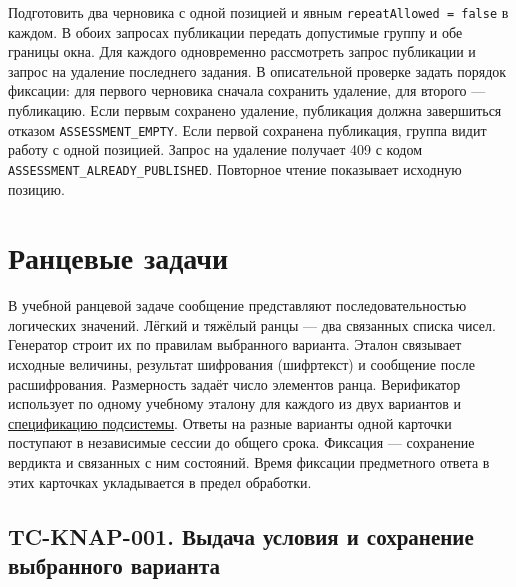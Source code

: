 \documentclass[12pt,a4paper]{article}
\begin{document}
Подготовить два черновика с одной позицией и явным \texttt{repeat\allowbreak{}Allowed =\allowbreak{} false} в каждом. В обоих запросах публикации передать допустимые группу и обе границы окна. Для каждого одновременно рассмотреть запрос публикации и запрос на удаление последнего задания. В описательной проверке задать порядок фиксации: для первого черновика сначала сохранить удаление, для второго --- публикацию. Если первым сохранено удаление, публикация должна завершиться отказом \texttt{ASSESSMENT\_\allowbreak{}EMPTY}. Если первой сохранена публикация, группа видит работу с одной позицией. Запрос на удаление получает 409 с кодом \texttt{ASSESSMENT\_\allowbreak{}ALREADY\_\allowbreak{}PUBLISHED}. Повторное чтение показывает исходную позицию.

\section{Ранцевые задачи}\label{ux440ux430ux43dux446ux435ux432ux44bux435-ux437ux430ux434ux430ux447ux438}

\hypertarget{ранцевые-задачи}{}

В учебной ранцевой задаче сообщение представляют последовательностью логических значений. Лёгкий и тяжёлый ранцы --- два связанных списка чисел. Генератор строит их по правилам выбранного варианта. Эталон связывает исходные величины, результат шифрования (шифртекст) и сообщение после расшифрования. Размерность задаёт число элементов ранца. Верификатор использует по одному учебному эталону для каждого из двух вариантов и {\href{../07\_Программные\_требования/DOC-06.3\_Ранцевые\_криптосистемы.pdf\#doc-063-ранцевые-криптосистемы}{спецификацию подсистемы}}. Ответы на разные варианты одной карточки поступают в независимые сессии до общего срока. Фиксация --- сохранение вердикта и связанных с ним состояний. Время фиксации предметного ответа в этих карточках укладывается в предел обработки.

\subsection{TC-KNAP-001. Выдача условия и сохранение выбранного варианта}\label{tc-knap-001-ux432ux44bux434ux430ux447ux430-ux443ux441ux43bux43eux432ux438ux44f-ux438-ux441ux43eux445ux440ux430ux43dux435ux43dux438ux435-ux432ux44bux431ux440ux430ux43dux43dux43eux433ux43e-ux432ux430ux440ux438ux430ux43dux442ux430}

\hypertarget{tc-knap-001-выдача-условия-и-сохранение-выбранного-варианта}{}
\end{document}
